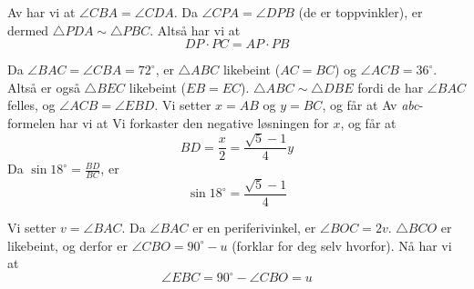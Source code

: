 




	\footnotesize
\opgt

Av  har vi at $ \angle CBA=\angle CDA $. Da $ \angle CPA=\angle DPB $ (de er toppvinkler), er dermed $ \triangle PDA \sim \triangle PBC$. Altså har vi at
\[ DP\cdot PC=AP\cdot PB \]


Da $ \angle BAC=\angle CBA=72^\circ $, er $ \triangle ABC $ likebeint ($ AC=BC $) og $ \angle ACB= 36^\circ $. Altså er også $ \triangle BEC $ likebeint ($ EB=EC $). $ \triangle ABC \sim \triangle DBE$ fordi de har $ \angle BAC $ felles, og $ \angle ACB=\angle EBD $. Vi setter $ x=AB $ og $ y=BC $, og får at
Av \textit{abc}-formelen har vi at
Vi forkaster den negative løsningen for $ x $, og får at
\[BD=\frac{x}{2}=\frac{\sqrt{5}-1}{4}y  \]
Da $ \sin 18^\circ=\frac{BD}{BC} $, er
\[ \sin 18^\circ = \frac{\sqrt{5}-1}{4} \]


Vi setter $ v=\angle BAC $.
Da $ \angle BAC $ er en periferivinkel, er $ \angle BOC=2v $. $ \triangle BCO $ er likebeint, og derfor er $ \angle CBO=90^\circ-u$ (forklar for deg selv hvorfor). Nå har vi at
\[ \angle EBC=90^\circ-\angle CBO=u \]


